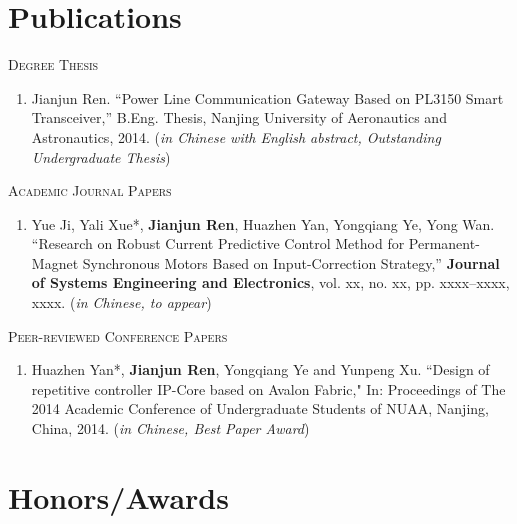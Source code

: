 \documentclass[a4paper,10pt]{article} %
\newcommand{\redf}[1]{\textcolor[rgb]{1,0,0}{#1}}
\begin{document}
\section{Publications}

\newcommand{\me}[1]{\textbf{#1}}
\newcommand{\comaut}[1]{#1*}

\textsc{Degree Thesis}

\begin{enumerate}%
\renewcommand{\labelenumi}{[T\arabic{enumi}] }
  \item Jianjun Ren. ``Power Line Communication Gateway Based on PL3150 Smart Transceiver,'' B.Eng. Thesis, Nanjing University of Aeronautics and Astronautics, 2014. (\emph{in Chinese with English abstract, \redf{Outstanding Undergraduate Thesis}})
\end{enumerate}

\vspace{0.2cm}
\textsc{Academic Journal Papers}

\begin{enumerate}%
\renewcommand{\labelenumi}{[J\arabic{enumi}] }
  \item Yue Ji, \comaut{Yali Xue}, \me{Jianjun Ren}, Huazhen Yan, Yongqiang Ye, Yong Wan. ``Research on Robust Current Predictive Control Method for Permanent-Magnet Synchronous Motors Based on Input-Correction Strategy,'' \textbf{Journal of Systems Engineering and Electronics}, vol. xx, no. xx, pp. xxxx--xxxx,  xxxx. (\emph{in Chinese, to appear})
\end{enumerate}

\vspace{0.2cm}
\textsc{Peer-reviewed Conference Papers}

\begin{enumerate}%
\renewcommand{\labelenumi}{[C\arabic{enumi}] }
  \item \comaut{Huazhen Yan}, \me{Jianjun Ren}, Yongqiang Ye and Yunpeng Xu. ``Design of repetitive controller IP-Core based on Avalon Fabric," In: Proceedings of The 2014 Academic Conference of Undergraduate Students of NUAA, Nanjing, China, 2014. (\emph{in Chinese, \redf{Best Paper Award}})
\end{enumerate}


\section{Honors/Awards}
\end{document}
